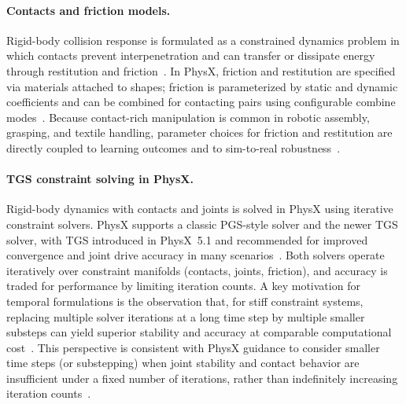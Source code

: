 \paragraph{Contacts and friction models.}
Rigid-body collision response is formulated as a constrained dynamics problem in which
contacts prevent interpenetration and can transfer or dissipate energy through restitution and
friction~\cite{physx_rigid_body_collision_510,isaac_sim_simulation_fundamentals_510}.
In PhysX, friction and restitution are specified via materials attached to shapes; friction is
parameterized by static and dynamic coefficients and can be combined for contacting pairs
using configurable combine modes~\cite{physx_rigid_body_dynamics_511,physx_material_api_510}.
Because contact-rich manipulation is common in robotic assembly, grasping, and textile
handling, parameter choices for friction and restitution are directly coupled to learning
outcomes and to sim-to-real robustness~\cite{Salvato2021RealityGapSurvey,Peng2018DynamicsRandomization}.

\paragraph{\acs{TGS} constraint solving in PhysX.}
Rigid-body dynamics with contacts and joints is solved in PhysX using iterative constraint
solvers. PhysX supports a classic \acs{PGS}-style solver and the newer \acs{TGS} solver, with
\acs{TGS} introduced in PhysX~5.1 and recommended for improved convergence and joint
drive accuracy in many scenarios~\cite{physx_rigid_body_dynamics_511}.
Both solvers operate iteratively over constraint manifolds (contacts, joints, friction), and
accuracy is traded for performance by limiting iteration counts.
A key motivation for temporal formulations is the observation that, for stiff constraint
systems, replacing multiple solver iterations at a long time step by multiple smaller substeps
can yield superior stability and accuracy at comparable computational cost~\cite{Macklin2019SmallSteps,physx_best_practices_541}.
This perspective is consistent with PhysX guidance to consider smaller time steps (or
substepping) when joint stability and contact behavior are insufficient under a fixed number
of iterations, rather than indefinitely increasing iteration counts~\cite{physx_best_practices_541}.

